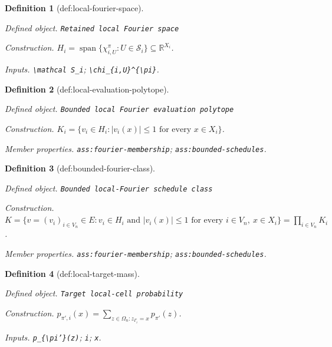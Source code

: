 \documentclass{article}
\newtheorem{definition}{Definition}
\begin{document}
\begin{definition}[def:local-fourier-space]\label{def:local-fourier-space}
\par\smallskip\noindent\emph{Defined object.} \texttt{Retained local Fourier space}
\par\smallskip\noindent\emph{Construction.} \(H_i=\operatorname{span}\{\chi_{i,U}^{\pi}:U\in\mathcal S_i\}\subseteq\mathbb R^{X_i}\).
\par\smallskip\noindent\emph{Inputs.} \texttt{\textbackslash{}\allowbreak{}mathcal S\_\allowbreak{}i}; \texttt{\textbackslash{}\allowbreak{}chi\_\allowbreak{}\{i,\allowbreak{}U\}\allowbreak{}\textasciicircum{}\{\textbackslash{}\allowbreak{}pi\}\allowbreak{}}.
\end{definition}

\begin{definition}[def:local-evaluation-polytope]\label{def:local-evaluation-polytope}
\par\smallskip\noindent\emph{Defined object.} \texttt{Bounded local Fourier evaluation polytope}
\par\smallskip\noindent\emph{Construction.} \(K_i=\{v_i\in H_i: |v_i(x)|\le1\text{ for every }x\in X_i\}\).
\par\smallskip\noindent\emph{Member properties.} \texttt{ass:\allowbreak{}fourier-\allowbreak{}membership}; \texttt{ass:\allowbreak{}bounded-\allowbreak{}schedules}.
\end{definition}

\begin{definition}[def:bounded-fourier-class]\label{def:bounded-fourier-class}
\par\smallskip\noindent\emph{Defined object.} \texttt{Bounded local-\allowbreak{}Fourier schedule class}
\par\smallskip\noindent\emph{Construction.} \(K=\{v=(v_i)_{i\in V_n}\in E: v_i\in H_i\text{ and }|v_i(x)|\le1\text{ for every }i\in V_n,\ x\in X_i\}=\prod_{i\in V_n}K_i\).
\par\smallskip\noindent\emph{Member properties.} \texttt{ass:\allowbreak{}fourier-\allowbreak{}membership}; \texttt{ass:\allowbreak{}bounded-\allowbreak{}schedules}.
\end{definition}

\begin{definition}[def:local-target-mass]\label{def:local-target-mass}
\par\smallskip\noindent\emph{Defined object.} \texttt{Target local-\allowbreak{}cell probability}
\par\smallskip\noindent\emph{Construction.} \(p_{\pi',i}(x)=\sum_{z\in\Omega_n:z_{\Gamma_i}=x}p_{\pi'}(z)\).
\par\smallskip\noindent\emph{Inputs.} \texttt{p\_\allowbreak{}\{\textbackslash{}\allowbreak{}pi'\}\allowbreak{}(z)}; \texttt{i}; \texttt{x}.
\end{definition}
\end{document}
